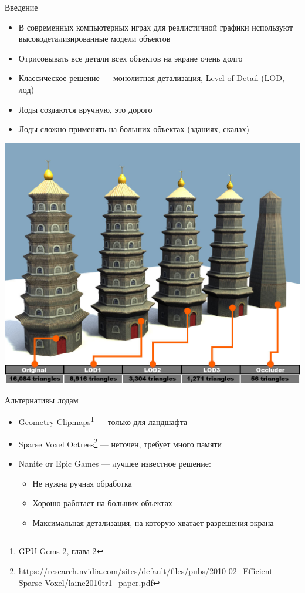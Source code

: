 \begin{frame}{Введение}
    \begin{itemize}
        \item В современных компьютерных играх для реалистичной графики используют высокодетализированные модели объектов
        \item Отрисовывать все детали всех объектов на экране очень долго
        \item Классическое решение --- монолитная детализация, Level of Detail (LOD, лод)
        \item Лоды создаются вручную, это дорого
        \item Лоды сложно применять на больших объектах (зданиях, скалах)
    \end{itemize}
    \begin{center}
        \includegraphics[height=.4\textheight]{pics/lod.jpg}
    \end{center}
\end{frame}

\begin{frame}{Альтернативы лодам}
    \begin{itemize}
        \item Geometry Clipmaps\footnote{GPU Gems 2, глава 2} --- только для ландшафта
        \item Sparse Voxel Octrees\footnote{\url{https://research.nvidia.com/sites/default/files/pubs/2010-02_Efficient-Sparse-Voxel/laine2010tr1_paper.pdf}} --- неточен, требует много памяти
        \item Nanite от Epic Games --- лучшее известное решение:
        \begin{itemize}
            \item Не нужна ручная обработка
            \item Хорошо работает на больших объектах
            \item Максимальная детализация, на которую хватает разрешения экрана
        \end{itemize}
    \end{itemize}
\end{frame}

